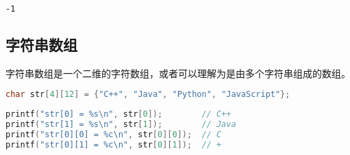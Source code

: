 \begin{tcolorbox}
	\begin{verbatim}
-1
	\end{verbatim}
\end{tcolorbox}

\vspace{0.5cm}

\subsection{字符串数组}

字符串数组是一个二维的字符数组，或者可以理解为是由多个字符串组成的数组。

\vspace{-0.5cm}

\begin{lstlisting}[language=C]
char str[4][12] = {"C++", "Java", "Python", "JavaScript"};
\end{lstlisting}

\begin{table}[H]
	\centering
\end{table}

\begin{lstlisting}[language=C]
printf("str[0] = %s\n", str[0]);		// C++
printf("str[1] = %s\n", str[1]);		// Java
printf("str[0][0] = %c\n", str[0][0]);	// C
printf("str[0][1] = %c\n", str[0][1]);	// +
\end{lstlisting}

\newpage